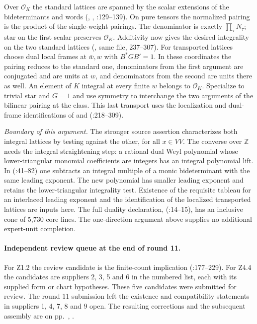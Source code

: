 Over $\mathcal O_K$ the standard lattices are spanned by the scalar
extensions of the bideterminants and words (,
, :129--139).
On pure tensors the normalized pairing is the product of the single-weight
pairings. The denominator is exactly $\prod_\tau N_\tau$; star on the
first scalar preserves $\mathcal O_K$. Additivity now gives the desired
integrality on the two standard lattices (, same file,
237--307). For transported lattices choose dual local frames at $\bar w,w$
with $B^*GB'=1$. In these coordinates the pairing reduces to the standard
one, denominators from the first argument are conjugated and are units at
$w$, and denominators from the second are units there as well. An element
of $K$ integral at every finite $w$ belongs to $\mathcal O_K$. Specialize
to trivial star and $G=1$ and use symmetry to interchange the two arguments
of the bilinear pairing at the class.
This last transport uses the localization and dual-frame identifications
of  and 
(:218--309).

\emph{Boundary of this argument.} The stronger source assertion characterizes
both integral lattices by testing against the other, for all $x\in VV$.
The converse over $\mathbb Z$ needs the integral straightening step:
a rational dual Weyl polynomial whose lower-triangular monomial
coefficients are integers has an integral polynomial lift. In
(:41--82) one subtracts an integral multiple
of a monic bideterminant with the same leading exponent. The new polynomial
has smaller leading exponent and retains the lower-triangular integrality
test. Existence of the requisite tableau for an interlaced leading
exponent and the identification of the localized transported lattices are
inputs here. The full duality declaration, 
(:14--15), has an
inclusive cone of 5,730 core lines. The one-direction argument above
supplies no additional expert-unit completion.

\paragraph{Independent review queue at the end of round 11.}
For Z1.2 the review candidate is the finite-count implication
 (:177--229).
For Z4.4 the candidates are suppliers 2, 3, 5 and 6 in the numbered list,
each with its supplied form or chart hypotheses. These five candidates
were submitted for review. The round 11 submission left the existence
and compatibility statements in suppliers 1, 4, 7, 8 and 9 open.
The resulting corrections and the subsequent assembly are on
pp.~\pageref{r12:trust}, \pageref{r12:assembly}.

